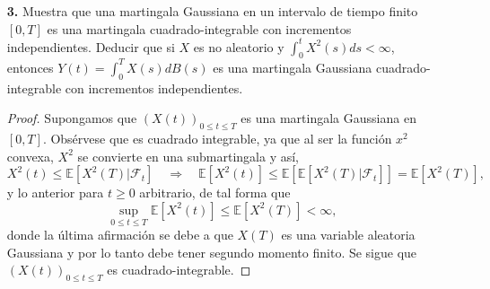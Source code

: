 \documentclass[letterpaper]{article}
\newcommand{\F}{\mathcal{F}}
\newcommand{\ent}{\Longrightarrow}
\newcommand{\E}{\mathbb{E}}
\newcommand{\1}{\mathds{1}}
\theoremstyle{definition}
\theoremstyle{definition}
\theoremstyle{definition}
\theoremstyle{definition}
\theoremstyle{definition}
\begin{document}
\begin{enumerate}
    \item[\textbf{3.}] Muestra que una martingala Gaussiana en un intervalo de tiempo
    finito $[0,T]$ es una martingala cuadrado-integrable con incrementos independientes.
    Deducir que si $X$ es no aleatorio y $\int_{0}^{t}X^2(s)ds<\infty$, entonces $Y(t)=
    \int_{0}^{T}X(s)dB(s)$ es una martingala Gaussiana cuadrado-integrable con 
    incrementos independientes.\\
    \begin{proof} 
        Supongamos que $(X(t))_{0\leq t \leq T}$ es una martingala Gaussiana en $[0,T]$. Obsérvese que es cuadrado
        integrable, ya que al ser la función $x^2$ convexa, $X^{2}$ se convierte en una submartingala y así,
        \[
        X^2(t)\leq \E\left[X^2(T)\big|\F_t\right] \quad \ent \quad \E\left[X^2(t)\right]\leq \E\left[\E\left[X^2(T)\big|\F_t\right]\right]=\E\left[X^2(T)\right],    
        \]
        y lo anterior para $t\geq0$ arbitrario, de tal forma que 
        \[
        \sup_{0\leq t \leq T} \E\left[X^2(t)\right]\leq \E\left[X^2(T)\right]< \infty,    
        \]
        donde la última afirmación se debe a que $X(T)$ es una variable aleatoria Gaussiana y por lo tanto 
        debe tener segundo momento finito. Se sigue que $(X(t))_{0\leq t \leq T}$ es cuadrado-integrable.
        \newline


\end{proof}
\end{enumerate}
\end{document}
